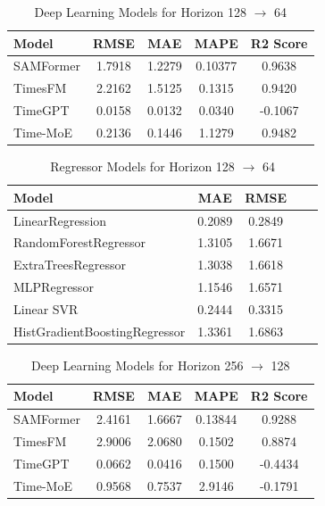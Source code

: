 \begin{table}[h!]
\centering
\begin{tabular}{lcccc}
\hline
Model & RMSE & MAE & MAPE & R2 Score \\
\hline
SAMFormer   & 1.7918 & 1.2279 & 0.10377 & 0.9638 \\
TimesFM     & 2.2162 & 1.5125 & 0.1315  & 0.9420 \\
TimeGPT     & 0.0158 & 0.0132 & 0.0340  & -0.1067 \\
Time-MoE    & 0.2136 & 0.1446 & 1.1279  & 0.9482 \\
\hline
\end{tabular}
\caption{Deep Learning Models for Horizon 128 \texorpdfstring{$\to$}{->} 64}
\label{tab:finance_128to64_dl}
\end{table}

\begin{table}[h!]
\centering
\begin{tabular}{lcccc}
\hline
Model & MAE & RMSE \\
\hline
LinearRegression              & 0.2089 & 0.2849 \\
RandomForestRegressor         & 1.3105 & 1.6671 \\
ExtraTreesRegressor           & 1.3038 & 1.6618 \\
MLPRegressor                  & 1.1546 & 1.6571 \\
Linear SVR                    & 0.2444 & 0.3315 \\
HistGradientBoostingRegressor & 1.3361 & 1.6863 \\
\hline
\end{tabular}
\caption{Regressor Models for Horizon 128 \texorpdfstring{$\to$}{->} 64}
\label{tab:finance_128to64_reg}
\end{table}

\begin{table}[h!]
\centering
\begin{tabular}{lcccc}
\hline
Model & RMSE & MAE & MAPE & R2 Score \\
\hline
SAMFormer   & 2.4161 & 1.6667 & 0.13844 & 0.9288 \\
TimesFM     & 2.9006 & 2.0680 & 0.1502  & 0.8874 \\
TimeGPT     & 0.0662 & 0.0416 & 0.1500  & -0.4434 \\
Time-MoE    & 0.9568 & 0.7537 & 2.9146  & -0.1791 \\
\hline
\end{tabular}
\caption{Deep Learning Models for Horizon 256 \texorpdfstring{$\to$}{->} 128}
\label{tab:finance_256to128_dl}
\end{table}

